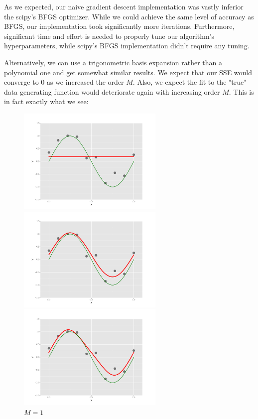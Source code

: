 \documentclass[10pt]{article}
\begin{document}
As we expected, our naive gradient descent implementation was vastly inferior the scipy's BFGS optimizer. While we could achieve the same level of accuracy as BFGS, our implementation took significantly more iterations. Furthermore, significant time and effort is needed to properly tune our algorithm's hyperparameters, while scipy's BFGS implementation didn't require any tuning. 

Alternatively, we can use a trigonometric basis expansion rather than a polynomial one and get somewhat similar results. We expect that our SSE would converge to 0 as we increased the order $M$. Also, we expect the fit to the "true" data generating function would deteriorate again with increasing order $M$. This is in fact exactly what we see: 

\begin{figure}[ht]
	\centering
	\begin{minipage}[b]{.24\linewidth}
		\includegraphics[width=1\linewidth, height=2in]{Meq0T.png}
		\caption*{$M=0$}
	\end{minipage}
	\begin{minipage}[b]{.24\linewidth}
		\includegraphics[width=1\linewidth, height=2in]{Meq1T.png}
		\caption*{$M=1$}
	\end{minipage}
	\begin{minipage}[b]{.24\linewidth}
		\includegraphics[width=1\linewidth, height=2in]{Meq3T.png}

\end{minipage}
\end{figure}
\end{document}

